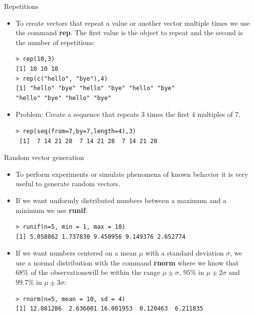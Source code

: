 \documentclass[handout]{beamer}
\begin{document}
\begin{frame}[fragile]{Repetitions}
\scriptsize{
\begin{itemize}
 \item To create vectors that repeat a value or another vector multiple times we use the command \textbf{rep}. The first value is the object to repeat and the second is the number of repetitions:
 \begin{verbatim}
> rep(10,3)
[1] 10 10 10
> rep(c("hello", "bye"),4)
[1] "hello" "bye" "hello" "bye" "hello" "bye"
"hello" "bye" "hello" "bye"
 \end{verbatim}
  \item Problem: Create a sequence that repeats 3 times the first 4 multiples of 7.
 \begin{verbatim}
> rep(seq(from=7,by=7,length=4),3)
 [1]  7 14 21 28  7 14 21 28  7 14 21 28
\end{verbatim}
 
 
\end{itemize}
 
 
 
} 
\end{frame}

\begin{frame}[fragile]{Random vector generation}
\scriptsize{
\begin{itemize}
 \item To perform experiments or simulate phenomena of known behavior it is very useful to generate random vectors.
 \item  If we want uniformly distributed numbers between a maximum and a minimum we use \textbf{runif}:
 \begin{verbatim}
> runif(n=5, min = 1, max = 10)
[1] 5.058862 1.737830 9.450956 9.149376 2.652774
 \end{verbatim}
 \item  If we want numbers centered on a mean $\mu$ with a standard deviation $\sigma$, we use a normal distribution with the command \textbf{rnorm} where we know that $68\%$  of the observationswill be within the range $\mu\pm\sigma$, $95\%$ in $\mu\pm2\sigma$ and $99.7\%$ in $\mu\pm3\sigma$:
 
 \begin{verbatim}
> rnorm(n=5, mean = 10, sd = 4)
[1] 12.081286  2.636001 16.001953  0.120463  6.211835
 \end{verbatim}
 
\end{itemize}

}
\end{frame}
\end{document}
